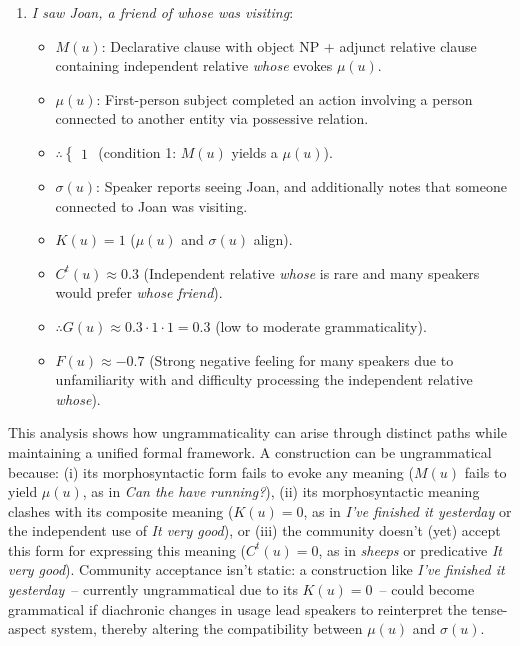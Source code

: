 \begin{enumerate}
    \item \textit{I saw Joan, a friend of whose was visiting}:
    \begin{itemize}
        \item \(M(u)\): Declarative clause with object NP + adjunct relative clause containing independent relative \textit{whose} evokes \(\mu(u)\).
        \item \(\mu(u)\): First-person subject completed an action involving a person connected to another entity via possessive relation.
        \item \(\therefore \begin{cases} 1 \end{cases}\) (condition 1: \(M(u)\) yields a \(\mu(u)\)).
        \item \(\sigma(u)\): Speaker reports seeing Joan, and additionally notes that someone connected to Joan was visiting.
        \item \(K(u) = 1\) (\(\mu(u)\) and \(\sigma(u)\) align).
        \item \(C^t(u) \approx 0.3\) (Independent relative \textit{whose} is rare and many speakers would prefer \textit{whose friend}).
        \item \(\therefore G(u) \approx 0.3 \cdot 1 \cdot 1 = 0.3\) (low to moderate grammaticality).
        \item \(F(u) \approx -0.7\) (Strong negative feeling for many speakers due to unfamiliarity with and difficulty processing the independent relative \textit{whose}).
    \end{itemize}
\end{enumerate}

This analysis shows how ungrammaticality can arise through distinct paths while maintaining a unified formal framework. A construction can be ungrammatical because: (i) its morphosyntactic form fails to evoke any meaning (\(M(u)\) fails to yield \(\mu(u)\), as in \textit{Can the have running?}), (ii) its morphosyntactic meaning clashes with its composite meaning (\(K(u) = 0\), as in \textit{I've finished it yesterday} or the independent use of \textit{It very good}), or (iii) the community doesn't (yet) accept this form for expressing this meaning (\(C^t(u) = 0\), as in \textit{sheeps} or predicative \textit{It very good}).  Community acceptance isn't static: a construction like \textit{I've finished it yesterday}~-- currently ungrammatical due to its \(K(u) = 0\)~-- could become grammatical if diachronic changes in usage lead speakers to reinterpret the tense-aspect system, thereby altering the compatibility between \(\mu(u)\) and \(\sigma(u)\).

